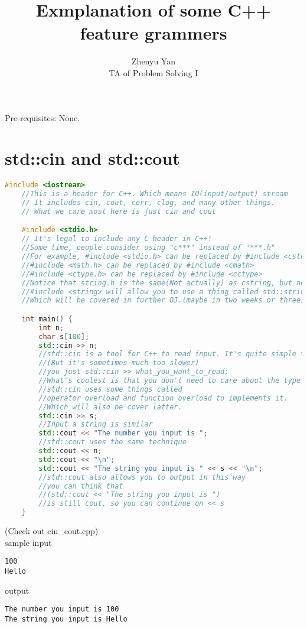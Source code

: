 \documentclass{article}
\title{Exmplanation of some C++ feature grammers}
\author{Zhenyu Yan\\TA of Problem Solving I}
\date{}
\begin{document}
\maketitle
Pre-requisites: None.
\section{std::cin and std::cout}
\begin{lstlisting}[language = C++]
    #include <iostream>
    //This is a header for C++. Which means IO(input/output) stream
    // It includes cin, cout, cerr, clog, and many other things.
    // What we care most here is just cin and cout

    #include <stdio.h>
    // It's legal to include any C header in C++!
    //Some time, people consider using "c***" instead of "***.h"
    //For example, #include <stdio.h> can be replaced by #include <cstdio>
    //#include <math.h> can be replaced by #include <cmath>
    //#include <ctype.h> can be replaced by #include <cctype>
    //Notice that string.h is the same(Not actually) as cstring, but not string!
    //#include <string> will allow you to use a thing called std::string.
    //Which will be covered in further OJ.(maybe in two weeks or three)

    int main() {
        int n;
        char s[100];
        std::cin >> n;
        //std::cin is a tool for C++ to read input. It's quite simple to use it,
        //(But it's sometimes much too slower)
        //you just std::cin >> what_you_want_to_read;
        //What's coolest is that you don't need to care about the type
        //std::cin uses some things called
        //operator overload and function overload to implements it.
        //Which will also be cover latter.
        std::cin >> s;
        //Input a string is similar
        std::cout << "The number you input is ";
        //std::cout uses the same technique
        std::cout << n;
        std::cout << "\n";
        std::cout << "The string you input is " << s << "\n";
        //std::cout also allows you to output in this way
        //you can think that
        //(std::cout << "The string you input is ")
        //is still cout, so you can continue on << s
    }
\end{lstlisting}
(Check out cin\_cout.cpp)\\
sample input
\begin{lstlisting}
100
Hello
\end{lstlisting}
output
\begin{lstlisting}
The number you input is 100
The string you input is Hello
\end{lstlisting}
\end{document}
